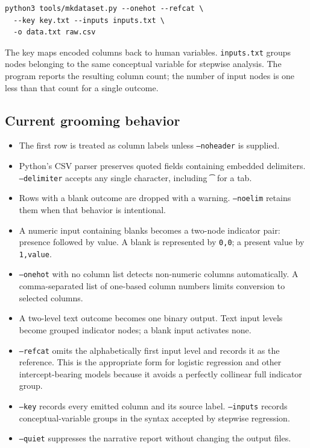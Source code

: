\begin{verbatim}
python3 tools/mkdataset.py --onehot --refcat \
  --key key.txt --inputs inputs.txt \
  -o data.txt raw.csv
\end{verbatim}

The key maps encoded columns back to human variables.
\texttt{inputs.txt} groups nodes belonging to the same conceptual
variable for stepwise analysis.  The program reports the resulting
column count; the number of input nodes is one less than that count
for a single outcome.

\subsection{Current grooming behavior}

\begin{itemize}
\item The first row is treated as column labels unless
\texttt{--noheader} is supplied.
\item Python's CSV parser preserves quoted fields containing embedded
delimiters.  \texttt{--delimiter} accepts any single character,
including \texttt{\string\t} for a tab.
\item Rows with a blank outcome are dropped with a warning.
\texttt{--noelim} retains them when that behavior is intentional.
\item A numeric input containing blanks becomes a two-node indicator
pair: presence followed by value.  A blank is represented by
\texttt{0,0}; a present value by \texttt{1,value}.
\item \texttt{--onehot} with no column list detects non-numeric
columns automatically.  A comma-separated list of one-based column
numbers limits conversion to selected columns.
\item A two-level text outcome becomes one binary output.  Text input
levels become grouped indicator nodes; a blank input activates none.
\item \texttt{--refcat} omits the alphabetically first input level and
records it as the reference.  This is the appropriate form for
logistic regression and other intercept-bearing models because it
avoids a perfectly collinear full indicator group.
\item \texttt{--key} records every emitted column and its source
label.  \texttt{--inputs} records conceptual-variable groups in the
syntax accepted by stepwise regression.
\item \texttt{--quiet} suppresses the narrative report without
changing the output files.
\end{itemize}

